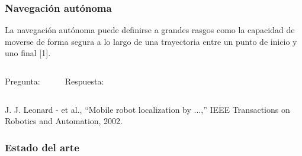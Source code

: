 \begin{frame}
    \frametitle{Navegación autónoma}
    \begin{block}{}
        La navegación autónoma puede definirse a grandes rasgos como la capacidad de moverse de forma segura a lo largo de una trayectoria entre un punto de inicio y uno final [1].
    \end{block}
    \vspace{5mm}
    \begin{columns}
        \hspace{13pt}Pregunta:
        \begin{enumerate}
        \end{enumerate}
        Respuesta:
        \begin{enumerate}[$\rightarrow$]
        \end{enumerate}
    \end{columns}
    \vfill
    \begin{tiny}
        [1] J. J. Leonard - et al., ``Mobile robot localization by ...,'' IEEE Transactions on Robotics and Automation, 2002.
    \end{tiny}
\end{frame}


\begin{frame}
    \frametitle{Estado del arte}

\end{frame}
